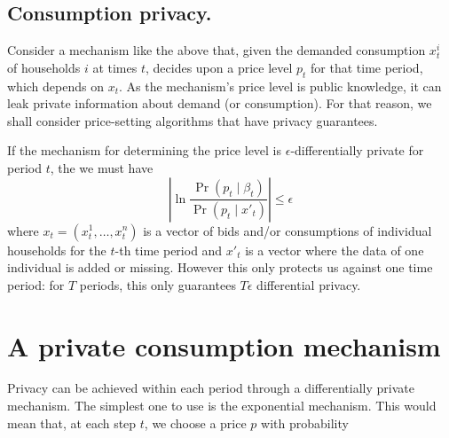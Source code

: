 \documentclass[a4paper,onecolumn]{article}
\numberwithin{algorithm}{section}
\theoremstyle{plain}
\theoremstyle{definition}
\theoremstyle{example}
\newcommand{\demand}{x}
\newcommand{\fdemand}{\beta}
\newcommand{\price}{p}
\newcommand{\cost}{c}
\begin{document}
\subsection{Consumption privacy.}

Consider a mechanism like the above that, given the demanded consumption
$\demand_t^i$ of households $i$ at times $t$, decides upon a price
level $\price_{t}$ for that time period, which depends on
$\demand_{t}$. As the mechanism's price level is public knowledge, it
can leak private information about demand (or consumption). For that
reason, we shall consider price-setting algorithms that have privacy
guarantees.

If the mechanism for determining the price level is
$\epsilon$-differentially private for period $t$, the we must have
\[
\left|
  \ln \frac{\Pr(\price_t \mid \fdemand_t)}{\Pr(\price_t \mid x'_t)}
\right|
 \leq \epsilon
\]
where $\demand_t = (\demand^1_t, \ldots, \demand^n_t)$ is a vector of
bids and/or consumptions of individual households for the $t$-th time
period and $x'_t$ is a vector where the data of one individual is
added or missing.  However this only protects us against one time
period: for $T$ periods, this only guarantees $T \epsilon$
differential privacy.

\section{A private consumption mechanism}

Privacy can be achieved within each period through a differentially
private mechanism. The simplest one to use is the exponential
mechanism. This would mean that, at each step $t$, we choose a price $p$ with probability




\end{document}
